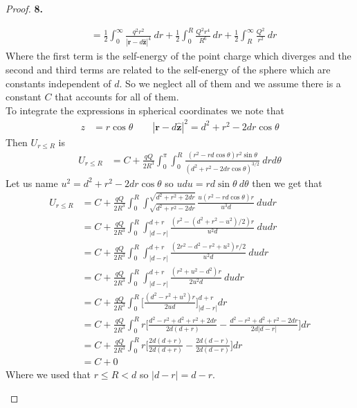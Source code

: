 \documentclass[11pt]{article}
\newcommand{\hatz}{\bm{\hat{z}}}
\theoremstyle{definition}
\begin{document}
\begin{proof}{\textbf{8.}}
\begin{itemize}
\begin{align*}
    &= \frac{1}{2} \int_0^\infty
    \frac{q^2 r^2}{|\bm{r} - d\hatz|^4}~ dr
    + \frac{1}{2} \int_0^R\frac{Q^2r^4}{R^6}
    ~ dr
    + \frac{1}{2} \int_R^\infty \frac{Q^2}{r^2}
    ~ dr 
\end{align*}
Where the first term is the self-energy of the point charge which diverges
and the second and third terms are related to the self-energy of the sphere
which are constants independent of $d$. So we neglect all of them and we assume
there is a constant $C$ that accounts for all of them.
\\
To integrate the expressions in spherical coordinates we note that
\begin{align*}
    z &= r\cos\theta
    \qquad 
    |\bm{r} - d\hatz|^2 = d^2 + r^2 - 2dr\cos\theta 
\end{align*}
Then $U_{r \leq R}$ is
\begin{align*}
    U_{r \leq R}
    &= C + \frac{qQ}{2R^3} \int_{0}^\pi\int_0^R
    \frac{(r^2 - rd\cos\theta)r^2\sin\theta}
    {(d^2 + r^2 - 2dr\cos\theta)^{3/2}}
    ~ drd\theta
\end{align*}
Let us name $u^2 = d^2 + r^2 - 2dr\cos\theta$ so
$udu = rd\sin\theta~d\theta$ then we get that
\begin{align*}
    U_{r \leq R}
    &= C + \frac{qQ}{2R^3} \int_0^R
    \int_{\sqrt{d^2 + r^2 - 2dr}}^{\sqrt{d^2 + r^2 + 2dr}}
    \frac{u(r^2 - rd\cos\theta)r}{u^3d}
    ~ dudr\\
    &= C + \frac{qQ}{2R^3} \int_0^R
    \int_{|d - r|}^{d + r}
    \frac{(r^2 - (d^2 + r^2 - u^2)/2)r}{u^2d}
    ~ dudr\\
    &= C + \frac{qQ}{2R^3} \int_0^R
    \int_{|d - r|}^{d + r}
    \frac{(2r^2 - d^2 - r^2 + u^2)r/2}{u^2d}
    ~ dudr\\
    &= C + \frac{qQ}{2R^3} \int_0^R
    \int_{|d - r|}^{d + r}
    \frac{(r^2 + u^2 - d^2)r}{2u^2d}
    ~ dudr\\
    &= C + \frac{qQ}{2R^3} \int_0^R
    \bigg[\frac{(d^2 - r^2 + u^2)r}{2ud}
    \bigg]_{|d - r|}^{d + r}
    dr\\
    &= C + \frac{qQ}{2R^3} \int_0^R
    r\bigg[\frac{d^2 - r^2 + d^2 + r^2 + 2dr}{2d(d + r)}
    - \frac{d^2 - r^2 + d^2 + r^2 - 2dr}{2d|d - r|}
    \bigg] dr\\
    &= C + \frac{qQ}{2R^3} \int_0^R
    r\bigg[\frac{2d(d + r)}{2d(d + r)}
    - \frac{2d(d - r)}{2d(d - r)}
    \bigg] dr\\
    &= C + 0
\end{align*}
Where we used that $r \leq R < d$ so $|d -r| = d - r$.

\end{itemize}
\end{proof}
\end{document}
